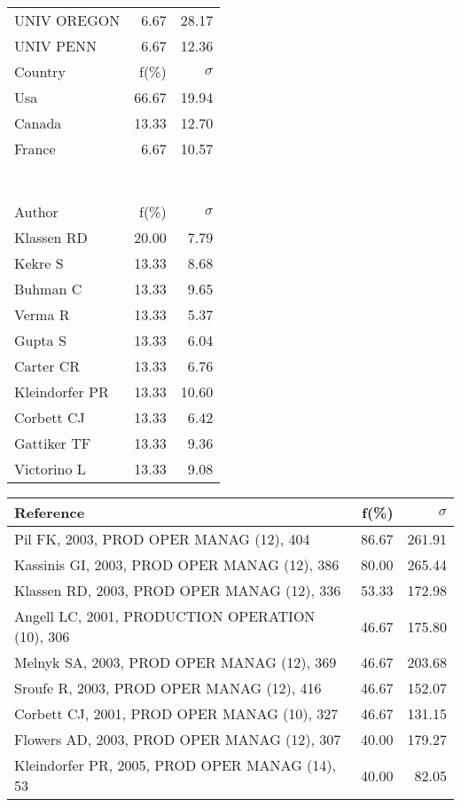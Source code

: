 \documentclass[a4paper,11pt]{report}
\begin{document}
\begin{landscape}
\begin{table}[!ht]
{\begin{tabular}{|l r r|}
UNIV OREGON & 6.67 & 28.17\\
UNIV PENN & 6.67 & 12.36\\
\hline
\hline
Country & f(\%) & $\sigma$\\
\hline
Usa & 66.67 & 19.94\\
Canada & 13.33 & 12.70\\
France & 6.67 & 10.57\\
 &  & \\
 &  & \\
 &  & \\
 &  & \\
 &  & \\
 &  & \\
 &  & \\
\hline
\hline
Author & f(\%) & $\sigma$\\
\hline
Klassen RD & 20.00 & 7.79\\
Kekre S & 13.33 & 8.68\\
Buhman C & 13.33 & 9.65\\
Verma R & 13.33 & 5.37\\
Gupta S & 13.33 & 6.04\\
Carter CR & 13.33 & 6.76\\
Kleindorfer PR & 13.33 & 10.60\\
Corbett CJ & 13.33 & 6.42\\
Gattiker TF & 13.33 & 9.36\\
Victorino L & 13.33 & 9.08\\
\hline
\end{tabular}
}
{\scriptsize\begin{tabular}{|l r r|}
\hline
Reference & f(\%) & $\sigma$\\
\hline
Pil FK, 2003, PROD OPER MANAG (12), 404 & 86.67 & 261.91\\
Kassinis GI, 2003, PROD OPER MANAG (12), 386 & 80.00 & 265.44\\
Klassen RD, 2003, PROD OPER MANAG (12), 336 & 53.33 & 172.98\\
Angell LC, 2001, PRODUCTION OPERATION (10), 306 & 46.67 & 175.80\\
Melnyk SA, 2003, PROD OPER MANAG (12), 369 & 46.67 & 203.68\\
Sroufe R, 2003, PROD OPER MANAG (12), 416 & 46.67 & 152.07\\
Corbett CJ, 2001, PROD OPER MANAG (10), 327 & 46.67 & 131.15\\
Flowers AD, 2003, PROD OPER MANAG (12), 307 & 40.00 & 179.27\\
Kleindorfer PR, 2005, PROD OPER MANAG (14), 53 & 40.00 & 82.05\\

\end{tabular}}
\end{table}
\end{landscape}
\end{document}
